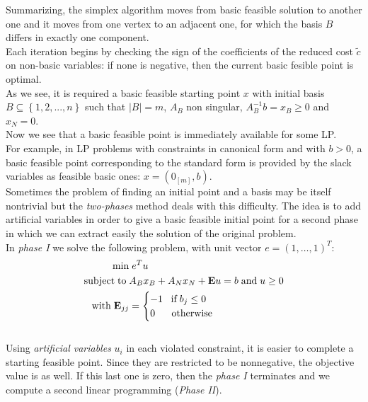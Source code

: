 \documentclass[a4paper,10 pt,titlepage,twoside]{book}
\theoremstyle{plain}
\theoremstyle{definition}
\theoremstyle{remark}
\begin{document}
Summarizing, the simplex algorithm moves from basic feasible solution to another one and it moves from one vertex to an adjacent one, for which the basis $B$ differs in exactly one component.\\ Each iteration begins by checking the sign of the coefficients of the reduced cost $\widetilde{c}$ on non-basic variables: if none is negative, then the current basic fesible point is optimal. \\
As we see, it is required a basic feasible starting point $x$ with initial basis $B \subseteq \left\{ 1,2,..., n \right\}$ such that $|B|=m$, $A_{B}$ non singular, $A_{B}^{-1}b=x_{B} \geq 0$ and $x_{N}=0$.\\[1cm]
Now we see that a basic feasible point is immediately available for some LP.\\ For example, in LP problems with constraints in canonical form and with $b > 0$, a basic feasible point corresponding to the standard form is provided by the slack variables as feasible basic ones: $x =\left(0_{[m]},b\right)$.\\Sometimes the problem of finding an initial point and a basis may be itself nontrivial but the \textit{two-phases} method deals with this difficulty. The idea is to add artificial variables in order to give a basic feasible initial point for a second phase in which we can extract easily the solution of the original problem.\\
In \textit{phase I} we solve the following problem, with unit vector $e= (1,\dots,1)^{T}$:
\begin{equation}\label{IIPH}
\begin{split}
\min &\;e^{T}u\\
\text{subject\;to\;}&A_{B}x_{B}+A_{N}x_{N} + \textbf{E}u = b\;\text{and\;} u\geq 0\\
\text{with\;} \textbf{E}_{jj}& =\begin{cases} -1\;\text{\;\;if\;} b_{j} \leq 0\\
0\;\; \text{\;\;\;\;otherwise}
\end{cases}   
\end{split}
\end{equation} \\
Using \textit{artificial variables} $u_{i}$ in each violated constraint, it is easier to complete a starting feasible point. Since they are restricted to be nonnegative, the objective value is as well. If this last one is zero, then the \textit{phase I} terminates and we compute a second linear programming (\textit{Phase II}).\\
\end{document}
